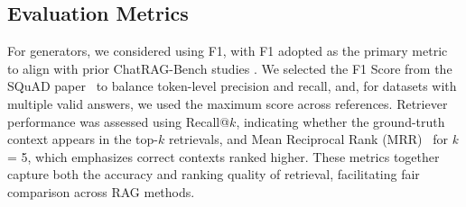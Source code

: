 \documentclass[11pt]{article}
\begin{document}

\subsection{Evaluation Metrics}\label{subsec:metrics}
For generators, we considered using F1, with F1 adopted as the primary metric to align with prior ChatRAG-Bench studies \cite{liu_chatqa_2024}. We selected the F1 Score from the SQuAD paper~\cite{rajpurkar_squad_2016} to balance token-level precision and recall, and, for datasets with multiple valid answers, we used the maximum score across references. Retriever performance was assessed using Recall@$k$, indicating whether the ground-truth context appears in the top-$k$ retrievals, and Mean Reciprocal Rank (MRR)~\cite{kantor_trec5_2000} for \textit{k} = 5, which emphasizes correct contexts ranked higher. These metrics together capture both the accuracy and ranking quality of retrieval, facilitating fair comparison across RAG methods.

\end{document}
